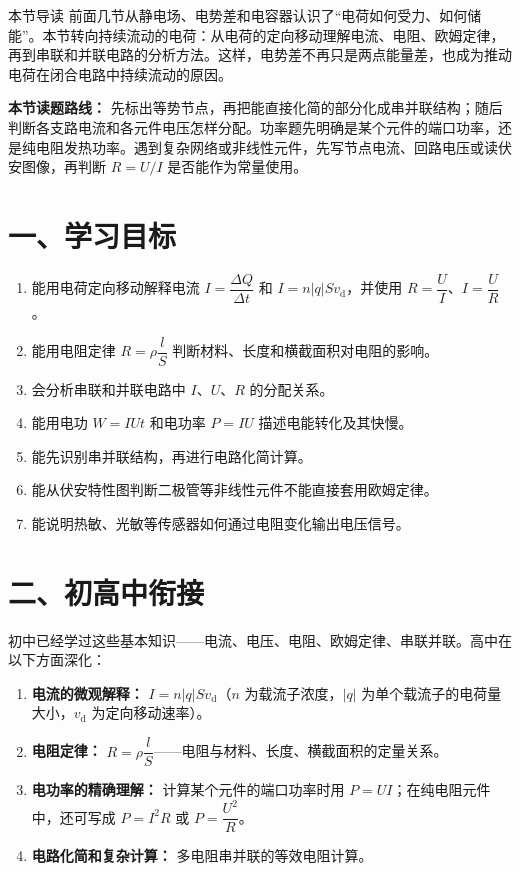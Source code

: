 
\begin{learningbox}{本节导读}
前面几节从静电场、电势差和电容器认识了“电荷如何受力、如何储能”。本节转向持续流动的电荷：从电荷的定向移动理解电流、电阻、欧姆定律，再到串联和并联电路的分析方法。这样，电势差不再只是两点能量差，也成为推动电荷在闭合电路中持续流动的原因。
\end{learningbox}

\textbf{本节读题路线：} 先标出等势节点，再把能直接化简的部分化成串并联结构；随后判断各支路电流和各元件电压怎样分配。功率题先明确是某个元件的端口功率，还是纯电阻发热功率。遇到复杂网络或非线性元件，先写节点电流、回路电压或读伏安图像，再判断 $R=U/I$ 是否能作为常量使用。

\section*{一、学习目标}

\begin{enumerate}
  \item 能用电荷定向移动解释电流 $I = \dfrac{\Delta Q}{\Delta t}$ 和 $I=n\lvert q\rvert Sv_{\mathrm d}$，并使用 $R = \dfrac{U}{I}$、$I = \dfrac{U}{R}$。
  \item 能用电阻定律 $R = \rho\dfrac{l}{S}$ 判断材料、长度和横截面积对电阻的影响。
  \item 会分析串联和并联电路中 $I$、$U$、$R$ 的分配关系。
  \item 能用电功 $W = IUt$ 和电功率 $P = IU$ 描述电能转化及其快慢。
  \item 能先识别串并联结构，再进行电路化简计算。
  \item 能从伏安特性图判断二极管等非线性元件不能直接套用欧姆定律。
  \item 能说明热敏、光敏等传感器如何通过电阻变化输出电压信号。
\end{enumerate}
\section*{二、初高中衔接}

初中已经学过这些基本知识——电流、电压、电阻、欧姆定律、串联并联。高中在以下方面深化：
\begin{enumerate}
  \item \textbf{电流的微观解释：} $I = n\lvert q\rvert Sv_{\mathrm d}$（$n$ 为载流子浓度，$\lvert q\rvert$ 为单个载流子的电荷量大小，$v_{\mathrm d}$ 为定向移动速率）。
  \item \textbf{电阻定律：} $R = \rho \dfrac{l}{S}$——电阻与材料、长度、横截面积的定量关系。
  \item \textbf{电功率的精确理解：} 计算某个元件的端口功率时用 $P = UI$；在纯电阻元件中，还可写成 $P = I^2R$ 或 $P = \dfrac{U^2}{R}$。
  \item \textbf{电路化简和复杂计算：} 多电阻串并联的等效电阻计算。
\end{enumerate}

